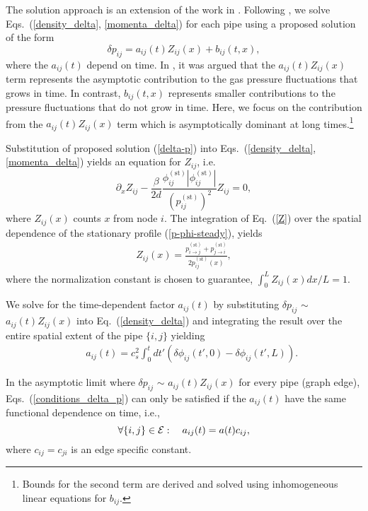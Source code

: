 \documentclass[10pt, conference, compsocconf]{IEEEtran}
\begin{document}
The solution approach is an extension of the work in \cite{14CLB}.  Following \cite{14CLB}, we solve Eqs.~(\ref{density_delta}, \ref{momenta_delta}) for each pipe using a proposed solution of the form
\begin{equation}
\delta p_{ij}=a_{ij}(t)Z_{ij}(x)+b_{ij}(t,x),\label{delta-p}
\end{equation}
where the $a_{ij}(t)$ depend on time. In \cite{14CLB}, it was argued that the $a_{ij}(t)Z_{ij}(x)$ term represents the asymptotic contribution to the  gas pressure fluctuations that grows in time.  In contrast, $b_{ij}(t,x)$ represents smaller contributions to the pressure fluctuations that do not grow in time. Here, we focus on the contribution from the $a_{ij}(t)Z_{ij}(x)$ term which is asymptotically dominant at long times.\footnote{Bounds for the second term are derived and solved using inhomogeneous linear equations for $b_{ij}$.}

Substitution of proposed solution (\ref{delta-p}) into Eqs.~(\ref{density_delta}, \ref{momenta_delta}) yields an equation for $Z_{ij}$, i.e.
\begin{equation}
\partial_x Z_{ij}-\frac{\beta}{2d}\frac{\phi_{ij}^{(\mbox{st})}|\phi_{ij}^{(\mbox{st})}|}{(p_{ij}^{(\mbox{st})})^2}Z_{ij}=0,
\label{Z}
\end{equation}
where $Z_{ij}(x)$ counts $x$ from node $i$. The integration of Eq.~(\ref{Z}) over the spatial dependence of the stationary profile (\ref{p-phi-steady}),  yields
\begin{eqnarray}
Z_{ij}(x)=\frac{p_{i\to j}^{(\mbox{st})}+p_{j\to i}^{(\mbox{st})}}{2p_{ij}^{(\mbox{st})}(x)},
\label{Z2}
\end{eqnarray}
where the normalization constant is chosen to guarantee, $\int_0^L Z_{ij}(x) dx/L=1$.

We solve for the time-dependent factor $a_{ij}(t)$ by substituting $\delta p_{ij}$ $\sim$ $a_{ij}(t)Z_{ij}(x)$ into Eq.~(\ref{density_delta}) and integrating the result over the entire spatial extent of the pipe $\{i,j\}$ yielding
\begin{eqnarray}
&& a_{ij}(t)=c_s^2\int_0^tdt'\left(\delta\phi_{ij}(t',0)-\delta\phi_{ij}(t',L)\right).
\label{a-via-delta-phi}
\end{eqnarray}

In the asymptotic limit where $\delta p_{ij}$ $\sim$ $a_{ij}(t)Z_{ij}(x)$ for every pipe (graph edge), Eqs.~(\ref{conditions_delta_p}) can only be satisfied if the $a_{ij}(t)$ have the same functional dependence on time, i.e.,
\begin{equation}
\forall \{i,j\}\in{\cal E}:\quad a_{ij}(t)=a(t)c_{ij},\label{a}
\end{equation}
where $c_{ij}=c_{ji}$ is an edge specific constant.
\end{document}
